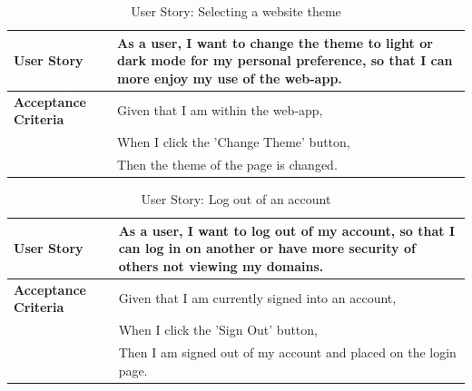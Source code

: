 \documentclass[12pt]{article}
\begin{document}
\begin{table}[htbp]
  \caption{User Story: Selecting a website theme}
  \begin{tabular}{|p{}|p{}|}
    \hline
    \textbf{User Story}          & As a user, I want to change the theme to light or dark mode for my personal preference, so that I can more enjoy my use of the web-app. \\
    \hline
    \textbf{Acceptance Criteria} &
    Given that I am within the web-app,                                                                                                                                    \\
                                 & When I click the 'Change Theme' button,                                                                                                 \\
                                 & Then the theme of the page is changed.                                                                                                  \\
    \hline
  \end{tabular}
\end{table}
\begin{table}[htbp]
  \caption{User Story: Log out of an account}
  \begin{tabular}{|p{}|p{}|}
    \hline
    \textbf{User Story}          & As a user, I want to log out of my account, so that I can log in on another or have more security of others not viewing my domains. \\
    \hline
    \textbf{Acceptance Criteria} &
    Given that I am currently signed into an account,                                                                                                                  \\
                                 & When I click the 'Sign Out' button,                                                                                                 \\
                                 & Then I am signed out of my account and placed on the login page.                                                                    \\
    \hline
  \end{tabular}
\end{table}
\end{document}
